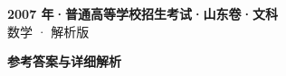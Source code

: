 \documentclass[zihao=-4, a4paper]{ctexart}
\begin{document}
\begin{center}
  {\Large\bfseries 2007 年·普通高等学校招生考试·山东卷·文科}\\[4pt]
  {\large 数学 · 解析版}
\end{center}
\medskip
{}

\clearpage
{}
\begin{center}{\Large\bfseries 参考答案与详细解析}\end{center}
\medskip

\end{document}
